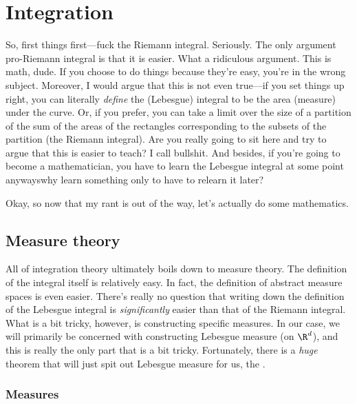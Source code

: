 \chapter{Integration}\label{chp5xx}

So, first things first---fuck the Riemann integral.  Seriously.  The only argument pro-Riemann integral is that it is easier.  What a ridiculous argument.  This is math, dude.  If you choose to do things because they're easy, you're in the wrong subject.  Moreover, I would argue that this is not even true---if you set things up right, you can literally \emph{define} the (Lebesgue) integral to be the area (measure) under the curve.  Or, if you prefer, you can take a limit over the size of a partition of the sum of the areas of the rectangles corresponding to the subsets of the partition (the Riemann integral).  Are you really going to sit here and try to argue that this is easier to teach?  I call bullshit.  And besides, if you're going to become a mathematician, you have to learn the Lebesgue integral at some point anyways\textellipsis why learn something only to have to relearn it later?

Okay, so now that my rant is out of the way, let's actually do some mathematics.

\section{Measure theory}

All of integration theory ultimately boils down to measure theory.  The definition of the integral itself is relatively easy.  In fact, the definition of abstract measure spaces is even easier.  There's really no question that writing down the definition of the Lebesgue integral is \emph{significantly} easier than that of the Riemann integral.  What is a bit tricky, however, is constructing specific measures.  In our case, we will primarily be concerned with constructing Lebesgue measure (on $\R ^d$), and this is really the only part that is a bit tricky.  Fortunately, there is a \emph{huge} theorem that will just spit out Lebesgue measure for us, the \emph{}.

\subsection{Measures}


